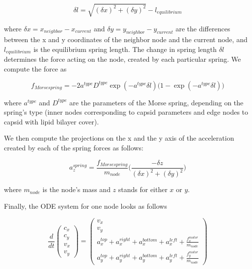 \begin{equation}
\delta l = \sqrt{(\delta x)^2 + (\delta y)^2} - l_{equilibrium}
\end{equation}

where $\delta x = x_{neighbor} - x_{current}$ and $\delta y = y_{neighbor} - y_{current}$ are the differences between the x and y coordinates of the neighbor node and the current node, and $l_{equilibrium}$ is the equilibrium spring length. The change in spring length $\delta l$ determines the force acting on the node, created by each particular spring. We compute the force as

\begin{equation}
f_{Morse spring} = -2 a^{type} D^{type} \exp(-a^{type} \delta l) \big(1 - \exp(-a^{type} \delta l)\big)
\end{equation}
 
where $a^{type}$ and $D^{type}$ are the parameters of the Morse spring, depending on the spring’s type (inner nodes corresponding to capsid parameters and edge nodes to capsid with lipid bilayer cover).

We then compute the projections on the x and the y axis of the acceleration created by each of the spring forces as follows:

\begin{equation}
a^{spring}_z = \frac{f_{Morse spring}}{m_{node}} \big(\frac{-\delta z}{(\delta x)^2 + (\delta y)^2}\big)
\end{equation}

where $m_{node}$ is the node’s mass and $z$ stands for either $x$ or $y$.

Finally, the ODE system for one node looks as follows

\begin{equation}
\frac{d}{dt}
\begin{pmatrix}
c_x\\
c_y\\
v_x\\
v_y
\end{pmatrix}
=
\begin{pmatrix}
v_x\\
v_y\\
a^{top}_x + a^{right}_x + a^{bottom}_x + a^{left}_x + \frac{f^{motor}_x}{m_{node}}\\
a^{top}_y + a^{right}_y + a^{bottom}_y + a^{left}_y + \frac{f^{motor}_y}{m_{node}}
\end{pmatrix}
\end{equation}


